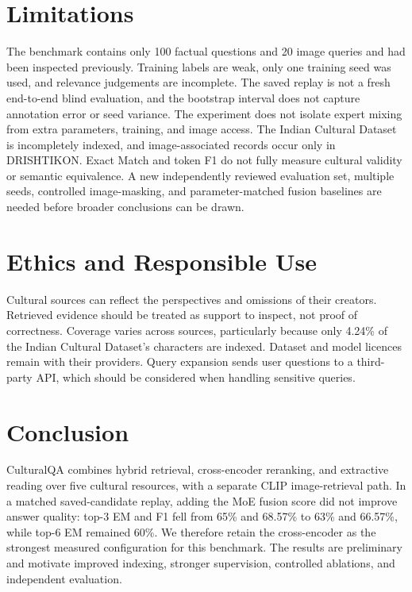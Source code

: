 \documentclass[10pt,a4paper]{article}
\begin{document}
\section{Limitations}
The benchmark contains only 100 factual questions and 20 image queries and had been inspected previously. Training labels are weak, only one training seed was used, and relevance judgements are incomplete. The saved replay is not a fresh end-to-end blind evaluation, and the bootstrap interval does not capture annotation error or seed variance. The experiment does not isolate expert mixing from extra parameters, training, and image access. The Indian Cultural Dataset is incompletely indexed, and image-associated records occur only in DRISHTIKON. Exact Match and token F1 do not fully measure cultural validity or semantic equivalence. A new independently reviewed evaluation set, multiple seeds, controlled image-masking, and parameter-matched fusion baselines are needed before broader conclusions can be drawn.

\section*{Ethics and Responsible Use}
Cultural sources can reflect the perspectives and omissions of their creators. Retrieved evidence should be treated as support to inspect, not proof of correctness. Coverage varies across sources, particularly because only 4.24\% of the Indian Cultural Dataset's characters are indexed. Dataset and model licences remain with their providers. Query expansion sends user questions to a third-party API, which should be considered when handling sensitive queries.

\section{Conclusion}
CulturalQA combines hybrid retrieval, cross-encoder reranking, and extractive reading over five cultural resources, with a separate CLIP image-retrieval path. In a matched saved-candidate replay, adding the MoE fusion score did not improve answer quality: top-3 EM and F1 fell from 65\% and 68.57\% to 63\% and 66.57\%, while top-6 EM remained 60\%. We therefore retain the cross-encoder as the strongest measured configuration for this benchmark. The results are preliminary and motivate improved indexing, stronger supervision, controlled ablations, and independent evaluation.

\end{document}
